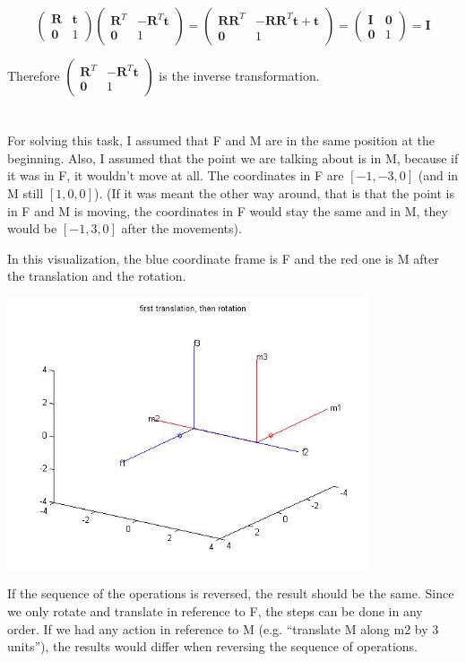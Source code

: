 \documentclass[a4paper,11pt]{article}
\begin{document}
\[
\begin{pmatrix}
  \mathbf{R} & \mathbf{t} \\
  \mathbf{0} & 1 
\end{pmatrix} 
\begin{pmatrix}
  \mathbf{R}^T & -\mathbf{R}^T\mathbf{t} \\
  \mathbf{0} & 1 
\end{pmatrix}
= 
\begin{pmatrix}
  \mathbf{R}\mathbf{R}^T & -\mathbf{R}\mathbf{R}^T\mathbf{t} + \mathbf{t} \\
  \mathbf{0} & 1 
\end{pmatrix}
= 
\begin{pmatrix}
  \mathbf{I} & \mathbf{0} \\
  \mathbf{0} & 1 
\end{pmatrix}
= \mathbf{I}
\]

Therefore $\begin{pmatrix}
  \mathbf{R}^T & -\mathbf{R}^T\mathbf{t} \\
  \mathbf{0} & 1 
\end{pmatrix}$ is the inverse transformation.

\section{}
For solving this task, I assumed that F and M are in the same position at the beginning. Also, I assumed that the point we are talking about is in M, because if it was in F, it wouldn’t move at all. The coordinates in F are $[-1,-3, 0]$ (and in M still $[1, 0, 0]$). 
(If it was meant the other way around, that is that the point is in F and M is moving, the coordinates in F would stay the same and in M, they would be $[-1, 3, 0]$ after the movements).

In this visualization, the blue coordinate frame is F and the red one is M after the translation and the rotation.
\begin{center}
  \includegraphics[width=0.8\textwidth]{aufg5}
\end{center}

If the sequence of the operations is reversed, the result should be the same. Since we only rotate and translate in reference to F, the steps can be done in any order. If we had any action in reference to M (e.g. ``translate M along m2 by 3 units''), the results would differ when reversing the sequence of operations.
\end{document}
